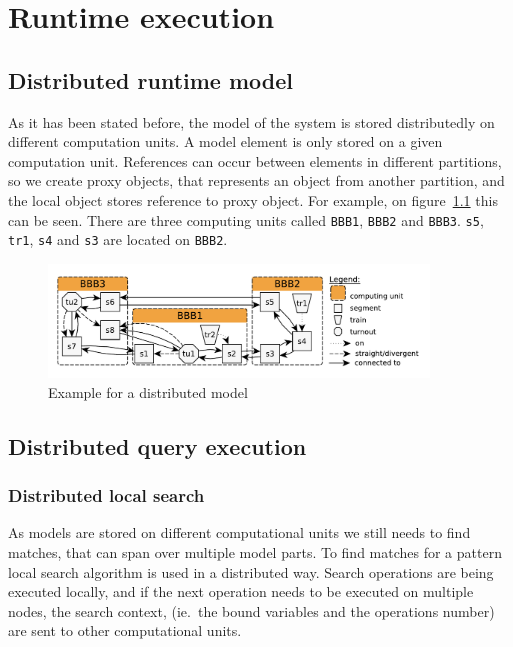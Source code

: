 %
\chapter{Runtime execution}
%


\section{Distributed runtime model}

As it has been stated before, the model of the system is stored distributedly on different computation units. A model element is only stored on a given computation unit. References can occur between elements in different partitions, so we create proxy objects, that represents an object from another partition, and the local object stores reference to proxy object. For example, on figure~\ref{fig:distrib-model-example} this can be seen. There are three computing units called \texttt{BBB1}, \texttt{BBB2} and \texttt{BBB3}. \texttt{s5}, \texttt{tr1}, \texttt{s4} and \texttt{s3} are located on \texttt{BBB2}. 

\begin{figure}[h]
	\begin{center}
		\includegraphics[width=0.9\textwidth]{figures/runtime-snapshot.pdf}
		\caption{Example for a distributed model}
		\label{fig:distrib-model-example}
	\end{center}
\end{figure}




\section{Distributed query execution}


\subsection{Distributed local search}

As models are stored on different computational units we still needs to find matches, that can span over multiple model parts. To find matches for a pattern local search algorithm is used in a distributed way. Search operations are being executed locally, and if the next operation needs to be executed on multiple nodes, the search context, (ie.\ the bound variables and the operations number) are sent to other computational units.

